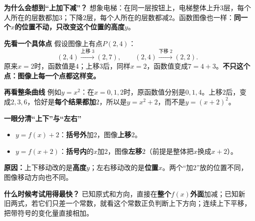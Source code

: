 \begin{explanationbox}
  \textbf{\textcolor{CExplanation}{为什么会想到“上加下减”？}}
  想象电梯：在同一层按钮上，电梯整体上升$3$层，每个人所在的层数都加$3$；下降$2$层，每个人所在的层数都减$2$。函数图像也一样：\textbf{同一个$x$的位置不动，只改变这个位置的高度$y$}。

  \medskip
  \textbf{\textcolor{CExplanation}{先看一个具体点}}
  假设图像上有点$P(2,4)$：
  \[
    (2,4)\xrightarrow{\text{上移 }3}(2,7),\qquad
    (2,4)\xrightarrow{\text{下移 }2}(2,2).
  \]
  原来$x=2$时，函数值是$4$；上移$3$后，同样$x=2$，函数值变成$7=4+3$。\textbf{不只这个点：图像上每一个点都这样变。}

  \begin{center}
  
  \end{center}

  \textbf{\textcolor{CExplanation}{再看整条曲线}}
  例如$y=x^2$：在$x=0,1,2$时，原函数值分别是$0,1,4$。上移$2$后，变成$2,3,6$，恰好是\textbf{每个结果都加$2$}，所以是$y=x^2+2$，而不是$y=(x+2)^2$。

  \medskip
  \textbf{\textcolor{CExplanation}{一眼分清“上下”与“左右”}}
  \begin{itemize}[leftmargin=*,itemsep=0.25em,topsep=0.2em]
    \item $y=\boxed{f(x)+2}$：\textbf{括号外}加$2$，图像\textbf{上移$2$}。
    \item $y=\boxed{f(x+2)}$：\textbf{括号内}的$x$加$2$，图像\textbf{左移$2$}（前提是整体把$x$换成$x+2$）。
  \end{itemize}
  \textbf{原因：}上下移动改的是\textbf{高度$y$}；左右移动改的是\textbf{位置$x$}。两个“加$2$”放的位置不同，图像移动方向也不同。

  \medskip
  \textbf{\textcolor{CExplanation}{什么时候考试用得最快？}}
  已知原式和方向，直接在\textbf{整个$f(x)$外面}加减；已知新旧两式，若它们只差一个常数，就看这个常数正负判断上下方向；连续上下平移，把带符号的变化量直接相加。
\end{explanationbox}
